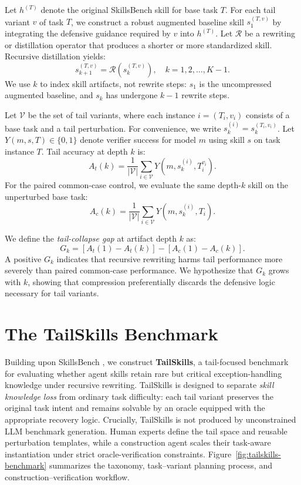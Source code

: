 \documentclass[11pt]{article}
\begin{document}
Let $h^{(T)}$ denote the original SkillsBench skill for base task $T$. For each tail variant $v$ of task $T$, we construct a robust augmented baseline skill $s_1^{(T,v)}$ by integrating the defensive guidance required by $v$ into $h^{(T)}$. Let $\mathcal{R}$ be a rewriting or distillation operator that produces a shorter or more standardized skill. Recursive distillation yields:
\begin{equation}
s_{k+1}^{(T,v)} = \mathcal{R}(s_k^{(T,v)}), \quad k = 1, 2, \dots, K-1.
\label{eq:distill}
\end{equation}
We use $k$ to index skill artifacts, not rewrite steps: $s_1$ is the uncompressed augmented baseline, and $s_k$ has undergone $k-1$ rewrite steps.

Let $\mathcal{V}$ be the set of tail variants, where each instance $i=(T_i,v_i)$ consists of a base task and a tail perturbation. For convenience, we write $s_k^{(i)} = s_k^{(T_i, v_i)}$. Let $Y(m,s,T)\in\{0,1\}$ denote verifier success for model $m$ using skill $s$ on task instance $T$. Tail accuracy at depth $k$ is:
\begin{equation}
A_t(k)=\frac{1}{|\mathcal{V}|}
\sum_{i\in\mathcal{V}}Y(m,s_k^{(i)},T_i^{v_i}).
\label{eq:tail-acc}
\end{equation}
For the paired common-case control, we evaluate the same depth-$k$ skill on the unperturbed base task:
\begin{equation}
A_c(k)=\frac{1}{|\mathcal{V}|}
\sum_{i\in\mathcal{V}}Y(m,s_k^{(i)},T_i).
\label{eq:common-acc}
\end{equation}

We define the \textit{tail-collapse gap} at artifact depth $k$ as:
\begin{equation}
G_k = [A_t(1)-A_t(k)] - [A_c(1)-A_c(k)].
\label{eq:gap}
\end{equation}
A positive $G_k$ indicates that recursive rewriting harms tail performance more severely than paired common-case performance. We hypothesize that $G_k$ grows with $k$, showing that compression preferentially discards the defensive logic necessary for tail variants.


\section{The TailSkills Benchmark}

Building upon SkillsBench \citep{li2026skillsbench}, we construct \textbf{TailSkills}, a tail-focused benchmark for evaluating whether agent skills retain rare but critical exception-handling knowledge under recursive rewriting. TailSkills is designed to separate \emph{skill knowledge loss} from ordinary task difficulty: each tail variant preserves the original task intent and remains solvable by an oracle equipped with the appropriate recovery logic. Crucially, TailSkills is not produced by unconstrained LLM benchmark generation. Human experts define the tail space and reusable perturbation templates, while a construction agent scales their task-aware instantiation under strict oracle-verification constraints. Figure~\ref{fig:tailskills-benchmark} summarizes the taxonomy, task--variant planning process, and construction--verification workflow.
\end{document}
